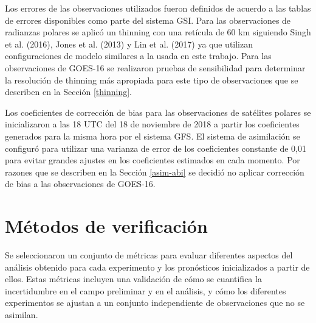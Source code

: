 \documentclass[12pt,oneside,a4paper]{reedthesis}
\begin{document}
Los errores de las observaciones utilizados fueron definidos de acuerdo a las tablas de errores disponibles como parte del sistema GSI. Para las observaciones de radianzas polares se aplicó un thinning con una retícula de 60 km siguiendo Singh et al. (2016), Jones et al. (2013) y Lin et al. (2017) ya que utilizan configuraciones de modelo similares a la usada en este trabajo. Para las observaciones de GOES-16 se realizaron pruebas de sensibilidad para determinar la resolución de thinning más apropiada para este tipo de observaciones que se describen en la Sección \ref{thinning}.

Los coeficientes de corrección de bias para las observaciones de satélites polares se inicializaron a las 18 UTC del 18 de noviembre de 2018 a partir los coeficientes generados para la misma hora por el sistema GFS. El sistema de asimilación se configuró para utilizar una varianza de error de los coeficientes constante de 0,01 para evitar grandes ajustes en los coeficientes estimados en cada momento. Por razones que se describen en la Sección \ref{asim-abi} se decidió no aplicar corrección de bias a las observaciones de GOES-16.

\hypertarget{muxe9todos-de-verificaciuxf3n}{%
\section{Métodos de verificación}\label{muxe9todos-de-verificaciuxf3n}}

Se seleccionaron un conjunto de métricas para evaluar diferentes aspectos del análisis obtenido para cada experimento y los pronósticos inicializados a partir de ellos. Estas métricas incluyen una validación de cómo se cuantifica la incertidumbre en el campo preliminar y en el análisis, y cómo los diferentes experimentos se ajustan a un conjunto independiente de observaciones que no se asimilan.
\end{document}
